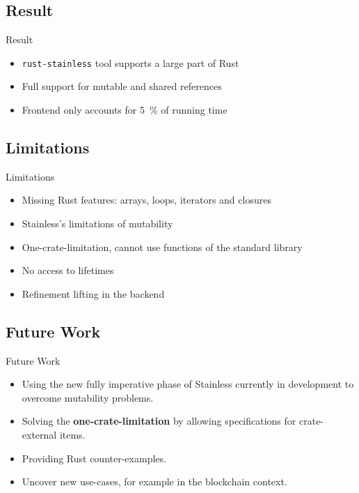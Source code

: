 \subsection{Result}

\begin{frame}{Result}
\begin{itemize}
  \item \texttt{rust-stainless} tool supports a large part of Rust
  \item Full support for mutable and shared references
  \item Frontend only accounts for 5~\% of running time
\end{itemize}
\end{frame}

\subsection{Limitations}

\begin{frame}[fragile]{Limitations}
\begin{itemize}
\item Missing Rust features: arrays, loops, iterators and closures
\item Stainless's limitations of mutability
\item One-crate-limitation, cannot use functions of the standard library
\item \color{gray} No access to lifetimes
\item Refinement lifting in the backend
\end{itemize}
\end{frame}

\subsection{Future Work}

\begin{frame}{Future Work}
\begin{itemize}
  \item Using the new fully imperative phase of Stainless currently in
  development to overcome mutability problems.

  \item Solving the \textbf{one-crate-limitation} by allowing specifications
  for crate-external items.

  \item Providing Rust counter-examples.

  \item Uncover new use-cases, for example in the blockchain context.
\end{itemize}
\end{frame}


